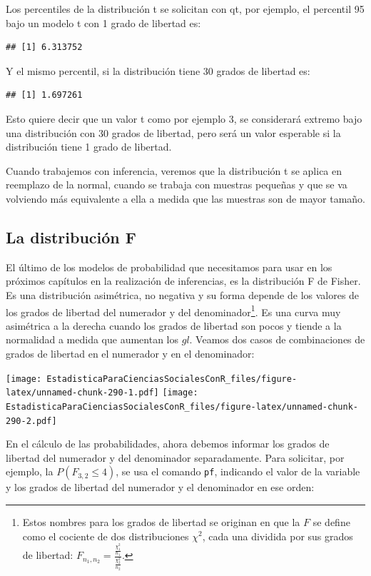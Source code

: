 \documentclass[]{book}
\let\rmarkdownfootnote\footnote%
\def\footnote{\protect\rmarkdownfootnote}
\begin{document}
Los percentiles de la distribución t se solicitan con qt, por ejemplo, el percentil 95 bajo un modelo t con 1 grado de libertad es:

\begin{verbatim}
## [1] 6.313752
\end{verbatim}

Y el mismo percentil, si la distribución tiene 30 grados de libertad es:

\begin{verbatim}
## [1] 1.697261
\end{verbatim}

Esto quiere decir que un valor t como por ejemplo 3, se considerará extremo bajo una distribución con 30 grados de libertad, pero será un valor esperable si la distribución tiene 1 grado de libertad.

Cuando trabajemos con inferencia, veremos que la distribución t se
aplica en reemplazo de la normal, cuando se trabaja con muestras
pequeñas y que se va volviendo más equivalente a ella a medida que las
muestras son de mayor tamaño.

\hypertarget{la-distribuciuxf3n-f}{%
\subsection{La distribución F}\label{la-distribuciuxf3n-f}}

El último de los modelos de probabilidad que necesitamos para usar en
los próximos capítulos en la realización de inferencias, es la
distribución F de Fisher. Es una distribución asimétrica, no negativa y
su forma depende de los valores de los grados de libertad del numerador
y del denominador\footnote{Estos nombres para los grados de libertad se originan en que la \(F\)
  se define como el cociente de dos distribuciones \(\chi^{2}\), cada
  una dividida por sus grados de libertad:
  \(F_{n_{1},n_{2}} = \frac{\frac{\chi_{1}^{2}}{n_{1}}}{\frac{\chi_{2}^{2}}{n_{2}}}\).}. Es una curva muy asimétrica a la derecha cuando
los grados de libertad son pocos y tiende a la normalidad a medida que
aumentan los \(gl\). Veamos dos casos de combinaciones de grados de
libertad en el numerador y en el denominador:

\texttt{[image: EstadisticaParaCienciasSocialesConR\_files/figure-latex/unnamed-chunk-290-1.pdf]} \texttt{[image: EstadisticaParaCienciasSocialesConR\_files/figure-latex/unnamed-chunk-290-2.pdf]}

En el cálculo de las probabilidades, ahora debemos informar los grados
de libertad del numerador y del denominador separadamente. Para
solicitar, por ejemplo, la \(P(F_{3,2} \leq 4)\), se usa el comando \texttt{pf}, indicando el valor de la variable y los grados de libertad del numerador y el denominador en ese orden:
\end{document}
